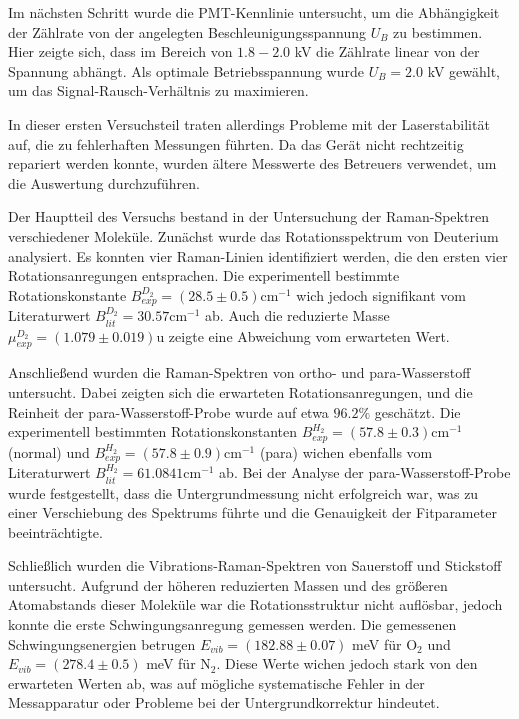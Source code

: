 \documentclass[11pt]{article}
\begin{document}
Im nächsten Schritt wurde die PMT-Kennlinie untersucht, um die Abhängigkeit der Zählrate von der angelegten Beschleunigungsspannung $U_B$ zu bestimmen. Hier zeigte sich, dass im Bereich von $1.8-2.0$ kV die Zählrate linear von der Spannung abhängt. Als optimale Betriebsspannung wurde $U_B = 2.0$ kV gewählt, um das Signal-Rausch-Verhältnis zu maximieren.

In dieser ersten Versuchsteil traten allerdings Probleme mit der Laserstabilität auf, die zu fehlerhaften Messungen führten. Da das Gerät nicht rechtzeitig repariert werden konnte, wurden ältere Messwerte des Betreuers verwendet, um die Auswertung durchzuführen.

Der Hauptteil des Versuchs bestand in der Untersuchung der Raman-Spektren verschiedener Moleküle. Zunächst wurde das Rotationsspektrum von Deuterium analysiert. Es konnten vier Raman-Linien identifiziert werden, die den ersten vier Rotationsanregungen entsprachen. Die experimentell bestimmte Rotationskonstante $B_{exp}^{D_2} = \left(28.5\pm 0.5\right)\mathrm{cm}^{-1}$ wich jedoch signifikant vom Literaturwert $B_{lit}^{D_2} = 30.57\mathrm{cm}^{-1}$ ab. Auch die reduzierte Masse $\mu_{exp}^{D_2} = \left(1.079\pm0.019\right)$u zeigte eine Abweichung vom erwarteten Wert.


Anschließend wurden die Raman-Spektren von ortho- und para-Wasserstoff untersucht. Dabei zeigten sich die erwarteten Rotationsanregungen, und die Reinheit der para-Wasserstoff-Probe wurde auf etwa $96.2\%$ geschätzt. Die experimentell bestimmten Rotationskonstanten $B_{exp}^{H_2} = \left(57.8\pm0.3\right)\mathrm{cm}^{-1}$ (normal) und $B_{exp}^{H_2} = \left(57.8\pm0.9\right)\mathrm{cm}^{-1}$ (para) wichen ebenfalls vom Literaturwert $B_{lit}^{H_2} = 61.0841\mathrm{cm}^{-1}$ ab. Bei der Analyse der para-Wasserstoff-Probe wurde festgestellt, dass die Untergrundmessung nicht erfolgreich war, was zu einer Verschiebung des Spektrums führte und die Genauigkeit der Fitparameter beeinträchtigte.


Schließlich wurden die Vibrations-Raman-Spektren von Sauerstoff und Stickstoff untersucht. Aufgrund der höheren reduzierten Massen und des größeren Atomabstands dieser Moleküle war die Rotationsstruktur nicht auflösbar, jedoch konnte die erste Schwingungsanregung gemessen werden. Die gemessenen Schwingungsenergien betrugen $E_{vib} =\left(182.88\pm0.07\right)$ meV für O$_2$ und $E_{vib} =\left(278.4\pm0.5\right)$ meV für N$_2$. Diese Werte wichen jedoch stark von den erwarteten Werten ab, was auf mögliche systematische Fehler in der Messapparatur oder Probleme bei der Untergrundkorrektur hindeutet.
\end{document}
